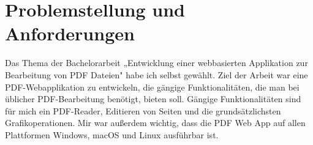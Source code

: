\section{Problemstellung und Anforderungen}
Das Thema der Bachelorarbeit „Entwicklung einer webbasierten Applikation zur Bearbeitung von PDF Dateien" habe ich selbst gewählt. Ziel der Arbeit war eine PDF-Webapplikation zu entwickeln, die gängige Funktionalitäten, die man bei üblicher PDF-Bearbeitung benötigt, bieten soll. Gängige Funktionalitäten sind für mich ein PDF-Reader, Editieren von Seiten und die grundsätzlichsten Grafikoperationen. Mir war außerdem wichtig, dass die PDF Web App auf allen Plattformen Windows, macOS und Linux ausführbar ist. 
